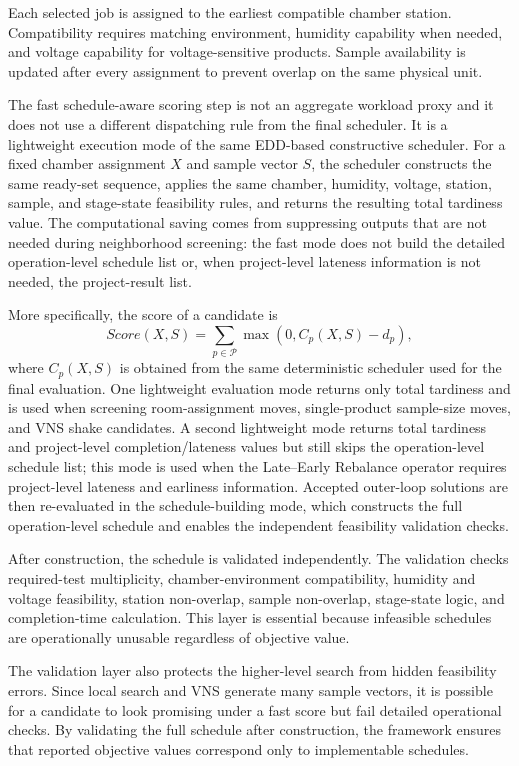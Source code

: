 \documentclass[11pt]{article}
\begin{document}
Each selected job is assigned to the earliest compatible chamber station. Compatibility requires matching environment, humidity capability when needed, and voltage capability for voltage-sensitive products. Sample availability is updated after every assignment to prevent overlap on the same physical unit.

The fast schedule-aware scoring step is not an aggregate workload proxy and it does not use a different dispatching rule from the final scheduler. It is a lightweight execution mode of the same EDD-based constructive scheduler. For a fixed chamber assignment \(X\) and sample vector \(S\), the scheduler constructs the same ready-set sequence, applies the same chamber, humidity, voltage, station, sample, and stage-state feasibility rules, and returns the resulting total tardiness value. The computational saving comes from suppressing outputs that are not needed during neighborhood screening: the fast mode does not build the detailed operation-level schedule list or, when project-level lateness information is not needed, the project-result list.

More specifically, the score of a candidate is
\[
Score(X,S)=\sum_{p\in\mathcal{P}}\max(0,C_p(X,S)-d_p),
\]
where \(C_p(X,S)\) is obtained from the same deterministic scheduler used for the final evaluation. One lightweight evaluation mode returns only total tardiness and is used when screening room-assignment moves, single-product sample-size moves, and VNS shake candidates. A second lightweight mode returns total tardiness and project-level completion/lateness values but still skips the operation-level schedule list; this mode is used when the Late--Early Rebalance operator requires project-level lateness and earliness information. Accepted outer-loop solutions are then re-evaluated in the schedule-building mode, which constructs the full operation-level schedule and enables the independent feasibility validation checks.

After construction, the schedule is validated independently. The validation checks required-test multiplicity, chamber-environment compatibility, humidity and voltage feasibility, station non-overlap, sample non-overlap, stage-state logic, and completion-time calculation. This layer is essential because infeasible schedules are operationally unusable regardless of objective value.

The validation layer also protects the higher-level search from hidden feasibility errors. Since local search and VNS generate many sample vectors, it is possible for a candidate to look promising under a fast score but fail detailed operational checks. By validating the full schedule after construction, the framework ensures that reported objective values correspond only to implementable schedules.
\end{document}
